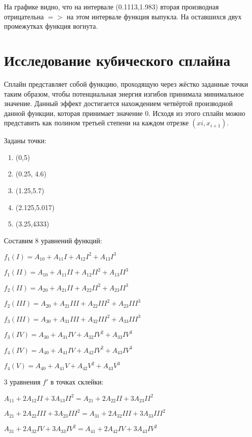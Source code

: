 \documentclass[russian,utf8,nocolumnxxxi,nocolumnxxxii]{eskdtext}
\begin{document}
\begin{enumerate}
На графике видно, что на интервале (0.1113,1.983) вторая производная отрицательна $=>$ на этом интервале функция выпукла. На оставшихся двух промежутках функция вогнута.
\end{enumerate}

\newpage
\section{Исследование кубического сплайна}

Сплайн представляет собой функцию, проходящую через жёстко заданные точки таким образом, чтобы потенциальная энергия изгибов принимала минимальное значение. Данный эффект достигается нахождением четвёртой производной данной функции, которая принимает значение 0. Исходя из этого сплайн можно представить как полином третьей степени на каждом отрезке $(xi,x_{i+1})$.

Заданы точки:
\begin{enumerate}[I]
   \item (0,5)
   \item (0.25, 4.6)
   \item (1.25,5.7)
   \item (2.125,5.017)
   \item (3.25,4333)
\end{enumerate}

Составим 8 уравнений функций:
\begin{center}

$f_1(I)=A_{10}+A_{11}I+A_{12}I^2+A_{13}I^3$

$f_1(II)=A_{10}+A_{11}II+A_{12}II^2+A_{13}II^3$

$f_2(II)=A_{20}+A_{21}II+A_{22}II^2+A_{23}II^3$

$f_2(III)=A_{20}+A_{21}III+A_{22}III^2+A_{23}III^3$

$f_3(III)=A_{30}+A_{31}III+A_{32}III^2+A_{33}III^3$

$f_3(IV)=A_{30}+A_{31}IV+A_{32}IV^2+A_{33}IV^3$

$f_4(IV)=A_{40}+A_{41}IV+A_{42}IV^2+A_{43}IV^3$

$f_4(V)=A_{40}+A_{41}V+A_{42}V^2+A_{43}V^3$

\end{center}

3 уравнения $f'$ в точках склейки:

\begin{center}
    
$A_{11}+2A_{12}II+3A_{13}II^2=A_{21}+2A_{22}II+3A_{23}II^2$

$A_{21}+2A_{22}III+3A_{23}III^2=A_{31}+2A_{32}III+3A_{33}III^2$

$A_{31}+2A_{32}IV+3A_{33}IV^2=A_{41}+2A_{42}IV+3A_{43}IV^2$
    
\end{center}
\end{document}
